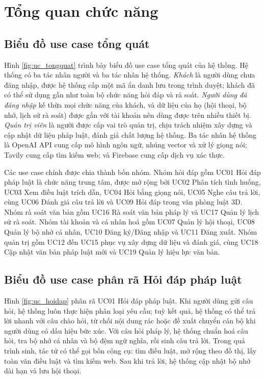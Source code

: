 \documentclass[../DoAn.tex]{subfiles}
\begin{document}
\section{Tổng quan chức năng}
\label{section:2.2}

\subsection{Biểu đồ use case tổng quát}
\label{subsection:2.2.1}
Hình \ref{fig:uc_tongquat} trình bày biểu đồ use case tổng quát của hệ thống. Hệ thống có ba tác nhân người và ba tác nhân hệ thống. \textit{Khách} là người dùng chưa đăng nhập, được hệ thống cấp một mã ẩn danh lưu trong trình duyệt; khách đã có thể sử dụng gần như toàn bộ chức năng hỏi đáp và rà soát. \textit{Người dùng đã đăng nhập} kế thừa mọi chức năng của khách, và dữ liệu của họ (hội thoại, bộ nhớ, lịch sử rà soát) được gắn với tài khoản nên dùng được trên nhiều thiết bị. \textit{Quản trị viên} là người được cấp vai trò quản trị, chịu trách nhiệm xây dựng và cập nhật dữ liệu pháp luật, đánh giá chất lượng hệ thống. Ba tác nhân hệ thống là OpenAI API cung cấp mô hình ngôn ngữ, nhúng vector và xử lý giọng nói; Tavily cung cấp tìm kiếm web; và Firebase cung cấp dịch vụ xác thực.


Các use case chính được chia thành bốn nhóm. Nhóm hỏi đáp gồm UC01 Hỏi đáp pháp luật là chức năng trung tâm, được mở rộng bởi UC02 Phân tích tình huống, UC03 Xem điều luật trích dẫn, UC04 Hỏi bằng giọng nói, UC05 Nghe câu trả lời, cùng UC06 Đánh giá câu trả lời và UC09 Hỏi đáp trong văn phòng luật 3D. Nhóm rà soát văn bản gồm UC16 Rà soát văn bản pháp lý và UC17 Quản lý lịch sử rà soát. Nhóm tài khoản và cá nhân hoá gồm UC07 Quản lý hội thoại, UC08 Quản lý bộ nhớ cá nhân, UC10 Đăng ký/Đăng nhập và UC11 Đăng xuất. Nhóm quản trị gồm UC12 đến UC15 phục vụ xây dựng dữ liệu và đánh giá, cùng UC18 Cập nhật văn bản pháp luật mới và UC19 Quản lý hiệu lực văn bản.

\subsection{Biểu đồ use case phân rã Hỏi đáp pháp luật}
\label{subsection:2.2.2}
Hình \ref{fig:uc_hoidap} phân rã UC01 Hỏi đáp pháp luật. Khi người dùng gửi câu hỏi, hệ thống luôn thực hiện phân loại yêu cầu; tuỳ kết quả, hệ thống có thể trả lời nhanh với câu chào hỏi, từ chối nội dung rác hoặc đề xuất chuyển cán bộ khi người dùng có dấu hiệu bức xúc. Với câu hỏi pháp lý, hệ thống chuẩn hoá câu hỏi, tra bộ nhớ cá nhân và bộ đệm ngữ nghĩa, rồi sinh câu trả lời. Trong quá trình sinh, tác tử có thể gọi bốn công cụ: tìm điều luật, mở rộng theo đồ thị, lấy toàn văn điều luật và tìm kiếm web. Sau khi trả lời, hệ thống cập nhật bộ nhớ dài hạn và lưu hội thoại.
\end{document}
